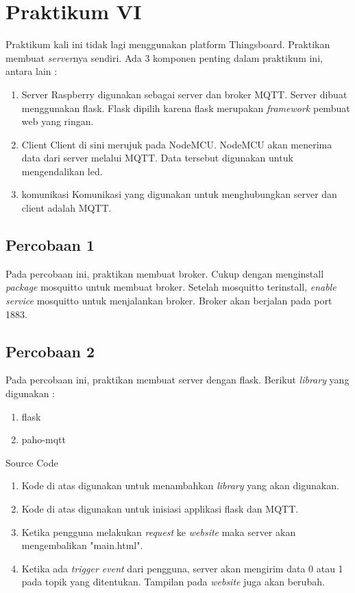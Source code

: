 \documentclass{class}
\begin{document}
  \section{Praktikum VI}
  Praktikum kali ini tidak lagi menggunakan platform Thingsboard.
  Praktikan membuat \emph{server}nya sendiri. 
  Ada 3 komponen penting dalam praktikum ini, antara lain :
  \begin{enumerate}
    \item Server
    Raspberry digunakan sebagai server dan broker MQTT.
    Server dibuat menggunakan flask.
    Flask dipilih karena flask merupakan \emph{framework} pembuat web yang ringan.
    \item Client
    Client di sini merujuk pada NodeMCU.
    NodeMCU akan menerima data dari server melalui MQTT.
    Data tersebut digunakan untuk mengendalikan led.
    \item komunikasi
    Komunikasi yang digunakan untuk menghubungkan server dan client adalah MQTT.
  \end{enumerate}
  \subsection{Percobaan 1}
  Pada percobaan ini, praktikan membuat broker.
  Cukup dengan menginstall \emph{package} mosquitto untuk membuat broker.
  Setelah mosquitto terinstall, \emph{enable service} mosquitto untuk menjalankan broker.
  Broker akan berjalan pada port 1883. \\
  \subsection{Percobaan 2}
  Pada percobaan ini, praktikan membuat server dengan flask.
  Berikut \emph{library} yang digunakan :
  \begin{enumerate}
    \item flask
    \item paho-mqtt
  \end{enumerate}
  Source Code
    \begin{enumerate}
      \item 
      Kode di atas digunakan untuk menambahkan \emph{library} yang akan digunakan. \\
      \item 
      Kode di atas digunakan untuk inisiasi applikasi flask dan MQTT. \\
      \item 
      Ketika pengguna melakukan \emph{request} ke \emph{website} maka server akan mengembalikan "main.html". \\
      \item 
      Ketika ada \emph{trigger event} dari pengguna, server akan mengirim data 0 atau 1 pada topik yang ditentukan.
      Tampilan pada \emph{website} juga akan berubah. \\
    \end{enumerate}
\end{document}
